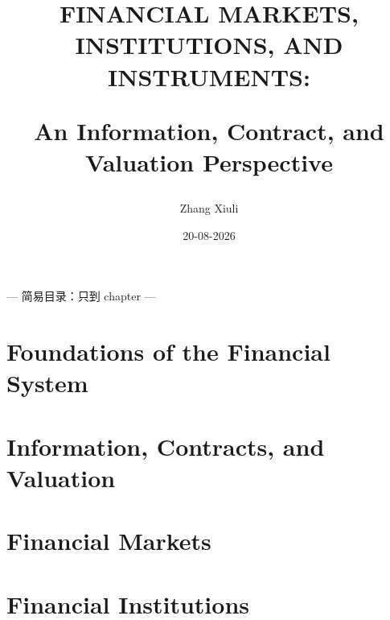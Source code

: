 \documentclass[12pt,a4paper]{book}
\begin{document}
\frontmatter
\title{FINANCIAL MARKETS, INSTITUTIONS, AND INSTRUMENTS: 

An Information, Contract, and Valuation Perspective}
\author{Zhang Xiuli}
\date{20-08-2026}
\maketitle  
{}
\newpage


\cleardoublepage

--- 简易目录：只到 chapter ---
\renewcommand\contentsname{Short Contents}
\tableofcontents

\cleardoublepage
\renewcommand\contentsname{Full Contents}
\tableofcontents
\cleardoublepage

\mainmatter

\part{Foundations of the Financial System}



\part{Information, Contracts, and Valuation}




\part{Financial Markets}







\part{Financial Institutions}





\end{document}
